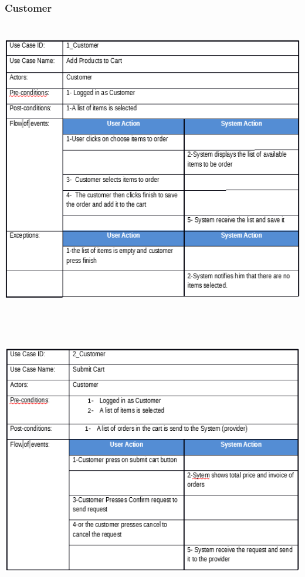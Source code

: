 \documentclass[12pt]{article}
\begin{document}
\subsubsection{ Customer }
\begin{center}
	\includegraphics[width=17cm,height=13cm]{./assets/usecasetable/customer-1.png}\\
	\includegraphics[width=17cm,height=13cm]{./assets/usecasetable/customer-2.png}\\

\end{center}
\end{document}

